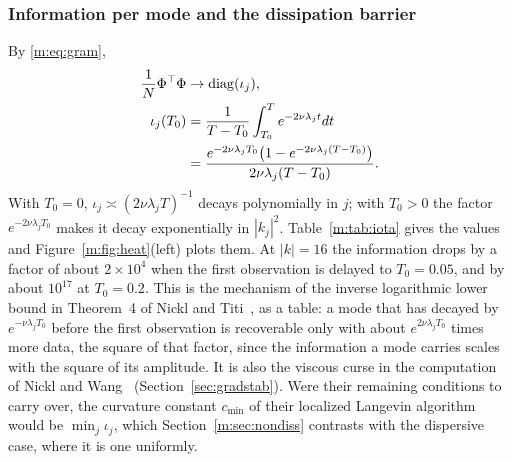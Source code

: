 \subsubsection{Information per mode and the dissipation barrier} By \eqref{m:eq:gram},
\begin{equation}\label{m:eq:iota}
\begin{aligned}
\frac1N\Phi^\top\Phi&\to\operatorname{diag}(\iota_j),\\
\iota_j(T_0)&=\frac{1}{T-T_0}\int_{T_0}^Te^{-2\nu\lambda_jt}dt\\
&=\frac{e^{-2\nu\lambda_jT_0}\big(1-e^{-2\nu\lambda_j(T-T_0)}\big)}{2\nu\lambda_j(T-T_0)} .
\end{aligned}
\end{equation}
With $T_0=0$, $\iota_j\asymp(2\nu\lambda_jT)^{-1}$ decays polynomially in $j$; with $T_0>0$ the factor $e^{-2\nu\lambda_jT_0}$ makes it decay exponentially in $|k_j|^2$. Table~\ref{m:tab:iota} gives the values and Figure~\ref{m:fig:heat}(left) plots them. At $|k|=16$ the information drops by a factor of about $2\times10^4$ when the first observation is delayed to $T_0=0.05$, and by about $10^{17}$ at $T_0=0.2$. This is the mechanism of the inverse logarithmic lower bound in Theorem~4 of Nickl and Titi~\cite{nickltiti2024}, as a table: a mode that has decayed by $e^{-\nu\lambda_jT_0}$ before the first observation is recoverable only with about $e^{2\nu\lambda_jT_0}$ times more data, the square of that factor, since the information a mode carries scales with the square of its amplitude. It is also the viscous curse in the computation of Nickl and Wang~\cite{nicklwang2024} (Section~\ref{sec:gradstab}). Were their remaining conditions to carry over, the curvature constant $c_{\min}$ of their localized Langevin algorithm would be $\min_j\iota_j$, which Section~\ref{m:sec:nondiss} contrasts with the dispersive case, where it is one uniformly.

